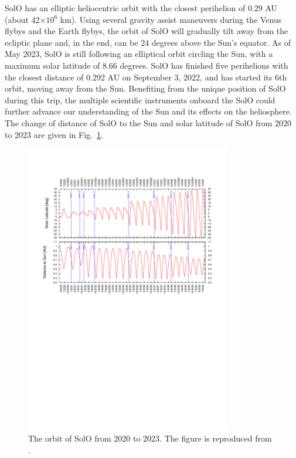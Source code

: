 
\ac{SolO} has an elliptic heliocentric orbit with the closest perihelion of 0.29 AU (about 42$\times10^6$ km). Using several gravity assist maneuvers during the Venus flybys and the Earth flybys, the orbit of \ac{SolO} will gradually tilt away from the ecliptic plane and, in the end, can be 24 degrees above the Sun's equator. As of May 2023, \ac{SolO} is still following an elliptical orbit circling the Sun, with a maximum solar latitude of 8.66 degrees. \ac{SolO} has finished five perihelions with the closest distance of 0.292 AU on September 3, 2022, and has started its 6th orbit, moving away from the Sun. Benefiting from the unique position of \ac{SolO} during this trip, the multiple scientific instruments onboard the \ac{SolO} could further advance our understanding of the Sun and its effects on the heliosphere. The change of distance of \ac{SolO} to the Sun and solar latitude of \ac{SolO} from 2020 to 2023 are given in Fig.~\ref{figL:SOLO_orbit_muller}.
\begin{figure}[ht]
    \centering
    \includegraphics[width=0.8\textwidth]{images/Muller2020-fig28.pdf}
    \caption[The orbit of \ac{SolO} between 2020-2030]{The orbit of \ac{SolO} from 2020 to 2023. The figure is reproduced from \citet{Mueller-2020-SolO}.}
    \label{figL:SOLO_orbit_muller}
\end{figure}

